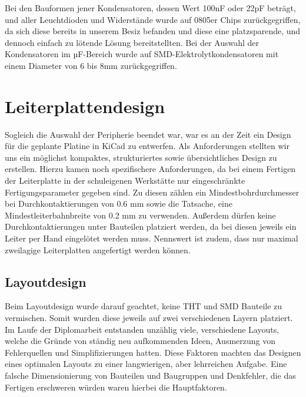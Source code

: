 Bei den Bauformen jener Kondensatoren, dessen Wert 100nF oder 22pF beträgt, und aller Leuchtdioden und Widerstände wurde auf 0805er Chips zurückgegriffen,
da sich diese bereits in unserem Besiz befanden und diese eine platzsparende, und dennoch einfach zu lötende Lösung bereitstellten.
Bei der Auswahl der Kondensatoren im µF-Bereich wurde auf SMD-Elektrolytkondensatoren mit einem Diameter von 6 bis 8mm zurückgegriffen.


\newpage
\section{Leiterplattendesign}

Sogleich die Auswahl der Peripherie beendet war, war es an der Zeit ein Design für die geplante Platine in KiCad zu entwerfen.
Als Anforderungen stellten wir uns ein möglichst kompaktes, strukturiertes sowie übersichtliches Design zu erstellen.
Hierzu kamen noch spezifischere Anforderungen, da bei einem Fertigen der Leiterplatte in der schuleigenen Werkstätte nur eingeschränkte Fertigungsparameter gegeben sind.
Zu diesen zählen ein Mindestbohrdurchmesser bei Durchkontaktierungen von 0.6 mm sowie die Tatsache, eine Mindestleiterbahnbreite von 0.2 mm zu verwenden.
Außerdem dürfen keine Durchkontaktierungen unter Bauteilen platziert werden, da bei diesen jeweils ein Leiter per Hand eingelötet werden muss.
Nennswert ist zudem, dass nur maximal zweilagige Leiterplatten angefertigt werden können.

\subsection{Layoutdesign}

Beim Layoutdesign wurde darauf geachtet, keine THT und SMD Bauteile zu vermischen.
Somit wurden diese jeweils auf zwei verschiedenen Layern platziert. \\
Im Laufe der Diplomarbeit entstanden unzählig viele, verschiedene Layouts, welche die Gründe von ständig neu aufkommenden Ideen, Ausmerzung von Fehlerquellen und Simplifizierungen hatten.
Diese Faktoren machten das Designen eines optimalen Layouts zu einer langwierigen, aber lehrreichen Aufgabe.
Eine falsche Dimensionierung von Bauteilen und Baugruppen und Denkfehler, die das Fertigen erschweren würden waren hierbei die Hauptfaktoren. \\

